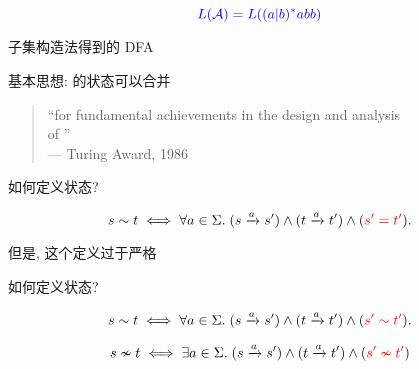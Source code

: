\begin{frame}{}

  \[
    \textcolor{blue}{L(\mathcal{A}) = L((a|b)^{\ast}abb)}
  \]


  \begin{center}
    子集构造法得到的 DFA
  \end{center}
\end{frame}

\begin{frame}{}
  \begin{center}
    基本思想: 的状态可以合并

    \vspace{0.30cm}

    \vspace{0.30cm}
    \begin{quote}
      \centering
      ``for fundamental achievements in the design and analysis \\
      of '' \\
      \hfill --- Turing Award, 1986
    \end{quote}
  \end{center}
\end{frame}

\begin{frame}{}
  \begin{center}
    如何定义状态?


    \[
      s \sim t \iff \forall a \in \Sigma.\; 
        (s \xrightarrow{a} s') \land (t \xrightarrow{a} t') \land (\textcolor{red}{s' = t'}).
    \]

    \pause
    但是, 这个定义过于严格
  \end{center}
\end{frame}

\begin{frame}{}
  \begin{center}
    如何定义状态?
  \end{center}


  \[
    s \sim t \iff \forall a \in \Sigma.\; 
      (s \xrightarrow{a} s') \land (t \xrightarrow{a} t') \land (\textcolor{red}{s' \sim t'}).
  \]

  \pause
  \[
    s \nsim t \iff \exists a \in \Sigma.\;
      (s \xrightarrow{a} s') \land (t \xrightarrow{a} t') \land (\textcolor{red}{s' \nsim t'})
  \]
\end{frame}

